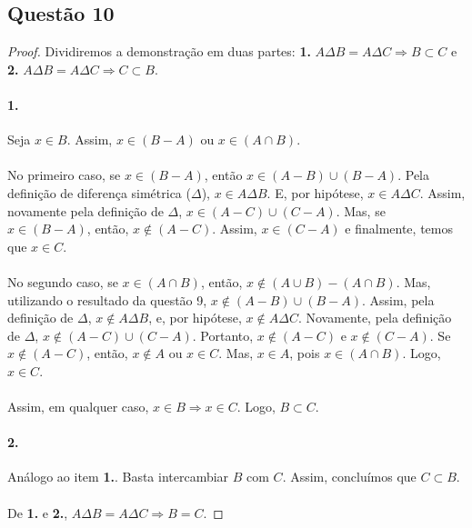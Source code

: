 \documentclass[9pt,twocolumn,a4paper]{article}
\begin{document}
    \subsection{Questão 10}
    \begin{proof}
    Dividiremos a demonstração em duas partes: \textbf{1.} $A \Delta B = A \Delta C \Rightarrow B \subset C$ e \textbf{2.} $A \Delta B = A\Delta C \Rightarrow C \subset B$.

    \paragraph{1.}
    Seja $x \in B$. Assim, $x \in (B - A)$ ou $x \in (A \cap B)$.

    \paragraph{}
    No primeiro caso, se $x \in (B - A)$, então $x \in (A - B) \cup (B - A)$. Pela definição de diferença simétrica ($\Delta$), $x \in A \Delta B$. E, por hipótese, $x \in A \Delta C$. Assim, novamente pela definição de $\Delta$, $x \in (A - C) \cup (C - A)$. Mas, se $x \in (B - A)$, então, $x \not\in (A - C)$. Assim, $x \in (C - A)$ e finalmente, temos que $x \in C$.

    \paragraph{}
    No segundo caso, se $x \in (A \cap B)$, então, $x \not\in (A \cup B) - (A \cap B)$. Mas, utilizando o resultado da questão 9, $x \not\in (A - B) \cup (B - A)$. Assim, pela definição de $\Delta$, $x \not\in A \Delta B$, e, por hipótese, $x \not\in A \Delta C$. Novamente, pela definição de $\Delta$, $x \not\in (A - C) \cup (C - A)$. Portanto, $x \not\in (A - C)$ e $x \not\in (C - A)$. Se $x \not\in (A - C)$, então, $x \not\in A$ ou $x \in C$. Mas, $x \in A$, pois $x \in (A \cap B)$. Logo, $x \in C$.

    \paragraph{}
    Assim, em qualquer caso, $x \in B \Rightarrow x \in C$. Logo, $B \subset C$.

    \paragraph{2.}
    Análogo ao item \textbf{1.}. Basta intercambiar $B$ com $C$. Assim, concluímos que $C \subset B$.

    \paragraph{}
    De \textbf{1.} e \textbf{2.}, $A \Delta B = A \Delta C \Rightarrow B = C$.
    \end{proof}
\end{document}
